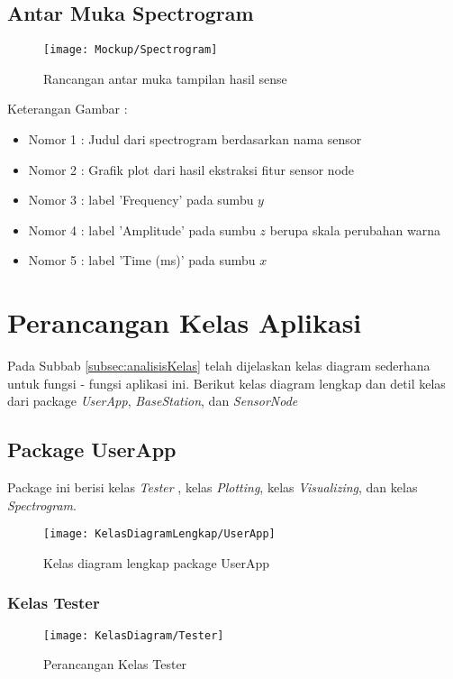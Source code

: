 \subsection{Antar Muka Spectrogram}
\begin{figure}[H]
	\centering
	\texttt{[image: Mockup/Spectrogram]}  
	\caption[Rancangan antar muka tampilan hasil sense]{Rancangan antar muka tampilan hasil sense} 
	\label{fig:MockupVisualizing} 
\end{figure} 
Keterangan Gambar : 
\begin{itemize}
	\item Nomor 1 : Judul dari spectrogram berdasarkan nama sensor
	\item Nomor 2 : Grafik plot dari hasil ekstraksi fitur sensor node
	\item Nomor 3 : label 'Frequency' pada sumbu $y$
	\item Nomor 4 : label 'Amplitude' pada sumbu $z$ berupa skala perubahan warna 
	\item Nomor 5 : label 'Time (ms)' pada sumbu $x$
\end{itemize}

\section{Perancangan Kelas Aplikasi}
Pada Subbab \ref{subsec:analisisKelas} telah dijelaskan kelas diagram sederhana untuk fungsi - fungsi aplikasi ini. Berikut kelas diagram lengkap
dan detil kelas dari package {\it UserApp}, {\it BaseStation}, dan {\it SensorNode}

\subsection{Package UserApp}
Package ini berisi kelas {\it Tester} , kelas {\it Plotting}, kelas {\it Visualizing}, dan kelas {\it Spectrogram}.

\begin{figure}[H]
	\centering
	\texttt{[image: KelasDiagramLengkap/UserApp]}  
	\caption[Kelas diagram lengkap package UserApp]{Kelas diagram lengkap package UserApp} 
	\label{fig:KelasDiagramLengkapUserApp} 
\end{figure} 

\subsubsection{Kelas Tester}
\begin{figure}[H]
	\centering
	\texttt{[image: KelasDiagram/Tester]}  
	\caption[Perancangan Kelas Tester]{Perancangan Kelas Tester} 
	\label{fig:KelasTester} 
\end{figure} 

